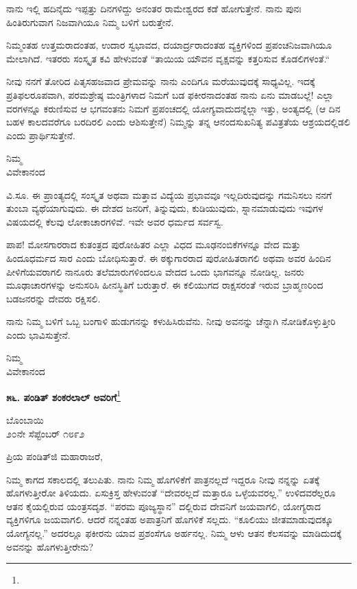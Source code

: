 ನಾನು ಇಲ್ಲಿ ಹದಿನೈದು ಇಪ್ಪತ್ತು ದಿನಗಳಿದ್ದು ಅನಂತರ ರಾಮೇಶ್ವರದ ಕಡೆ ಹೋಗುತ್ತೇನೆ. ನಾನು ಪುನಃ ಹಿಂತಿರುಗುವಾಗ ನಿಜವಾಗಿಯೂ ನಿಮ್ಮ ಬಳಿಗೆ ಬರುತ್ತೇನೆ.

ನಿಮ್ಮಂತಹ ಉತ್ತಮರಾದಂತಹ, ಉದಾರ ಸ್ವಭಾವದ, ದಯಾರ್ದ್ರರಾದಂತಹ ವ್ಯಕ್ತಿಗಳಿಂದ ಪ್ರಪಂಚನಿಜವಾಗಿಯೂ ಮೇಲಾಗಿದೆ. ಇತರರು ಸಂಸ್ಕೃತ ಕವಿ ಹೇಳುವಂತೆ “ತಾಯಿಯ ಯೌವನ ವೃಕ್ಷವನ್ನು ಕತ್ತರಿಸುವ ಕೊಡಲಿಗಳಂತೆ.“

ನೀವು ನನಗೆ ತೋರಿದ ಪಿತೃಸಹಜವಾದ ಪ್ರೇಮವನ್ನು ನಾನು ಎಂದಿಗೂ ಮರೆಯುವುದಕ್ಕೆ ಸಾಧ್ಯವಿಲ್ಲ. ಇದಕ್ಕೆ ಪ್ರತಿಫಲರೂಪವಾಗಿ, ಪರಮಶ್ರೇಷ್ಠ ಮಂತ್ರಿಗಳಾದ ನಿಮಗೆ ಬಡ ಫಕೀರನಾದಂತಹ ನಾನು ಏನು ಮಾಡಬಲ್ಲೆ! ಎಲ್ಲಾ ವರಗಳನ್ನೂ ಕರುಣಿಸುವ ಆ ಭಗವಂತನು ನಿಮಗೆ ಪ್ರಪಂಚದಲ್ಲಿ ಯೋಗ್ಯವಾದುದನ್ನೆಲ್ಲಾ ಇತ್ತು, ಅಂತ್ಯದಲ್ಲಿ (ಆ ದಿನ ಬಹಳ ಕಾಲದವರೆಗೂ ಬರದಿರಲಿ ಎಂದು ಆಶಿಸುತ್ತೇನೆ) ನಿಮ್ಮನ್ನು ತನ್ನ ಆನಂದಸುಖನಿತ್ಯ ಪವಿತ್ರತೆಯ ಆಶ್ರಯದಲ್ಲಿಡಲಿ ಎಂದು ಪ್ರಾರ್ಥಿಸುತ್ತೇನೆ.

{\flushright
ನಿಮ್ಮ\\ವಿವೇಕಾನಂದ\par}

\medskip

ವಿ.ಸೂ. \enginline{-}ಈ ಪ್ರಾಂತ್ಯದಲ್ಲಿ ಸಂಸ್ಕೃತ ಅಥವಾ ಮತ್ತಾವ ವಿದ್ಯೆಯ ಪ್ರಭಾವವೂ ಇಲ್ಲದಿರುವುದನ್ನು ಗಮನಿಸಲು ನನಗೆ ತುಂಬಾ ವ್ಯಥೆಯಾಗುವುದು. ಈ ದೇಶದ ಜನರಿಗೆ, ತಿನ್ನುವುದು, ಕುಡಿಯುವುದು, ಸ್ನಾನಮಾಡುವುದು ಇವುಗಳ ವಿಷಯದಲ್ಲಿ ಕೆಲವು ಲೋಕಾಚಾರಗಳಿವೆ. ಇವೇ ಅವರ ಧರ್ಮದ ಸರ್ವಸ್ವ.

ಪಾಪ! ಮೋಸಗಾರರಾದ ಕುತಂತ್ರದ ಪುರೋಹಿತರ ಎಲ್ಲಾ ವಿಧದ ಮೂಢನಂಬಿಕೆಗಳನ್ನೂ ವೇದ ಮತ್ತು ಹಿಂದೂಧರ್ಮದ ಸಾರ ಎಂದು ಬೋಧಿಸುತ್ತಾರೆ. ಈ ಠಕ್ಕುಗಾರರಾದ ಪುರೋಹಿತರಾಗಲಿ ಅಥವಾ ಅವರ ಹಿಂದಿನ ಪೀಳಿಗೆಯವರಾಗಲಿ ನಾನೂರು ತಲೆಮಾರುಗಳಿಂದಲೂ ವೇದದ ಒಂದು ಭಾಗವನ್ನೂ ನೋಡಿಲ್ಲ. ಜನರು ಮೂಢಾಚಾರಗಳನ್ನು ಅನುಸರಿಸಿ ಹೀನಸ್ಥಿತಿಗೆ ಬರುತ್ತಾರೆ. ಈ ಕಲಿಯುಗದ ರಾಕ್ಷಸರಂತೆ ಇರುವ ಬ್ರಾಹ್ಮಣರಿಂದ ಬಡಜನರನ್ನು ದೇವರು ರಕ್ಷಿಸಲಿ.

ನಾನು ನಿಮ್ಮ ಬಳಿಗೆ ಒಬ್ಬ ಬಂಗಾಳಿ ಹುಡುಗನನ್ನು ಕಳುಹಿಸಿರುವೆನು. ನೀವು ಅವನನ್ನು ಚೆನ್ನಾಗಿ ನೋಡಿಕೊಳ್ಳುತ್ತೀರಿ ಎಂದು ಭಾವಿಸುತ್ತೇನೆ.


{\flushright
ನಿಮ್ಮ\\ವಿವೇಕಾನಂದ\par}

\begin{center}
\textbf{೫೬. ಪಂಡಿತ್‌ ಶಂಕರಲಾಲ್ ಅವರಿಗೆ}\footnote{}
\end{center}


\begin{flushright}
ಬೊಂಬಾಯಿ\\೨೦ನೇ ಸೆಪ್ಟೆಂಬರ್ ೧೮೯೨
\end{flushright}

\noindent
ಪ್ರಿಯ ಪಂಡಿತ್‌ಜಿ ಮಹಾರಾಜರೆ,

ನಿಮ್ಮ ಕಾಗದ ಸಕಾಲದಲ್ಲಿ ತಲುಪಿತು. ನಾನು ನಿಮ್ಮ ಹೊಗಳಿಕೆಗೆ ಪಾತ್ರನಲ್ಲದೆ ಇದ್ದರೂ ನೀವು ನನ್ನನ್ನು ಏತಕ್ಕೆ ಹೊಗಳುತ್ತೀರೋ ತಿಳಿಯದು. ಏಸುಕ್ರಿಸ್ತ ಹೇಳುವಂತೆ “ದೇವರಲ್ಲದೆ ಮತ್ತಾರೂ ಒಳ್ಳೆಯವರಲ್ಲ.” ಉಳಿದವರೆಲ್ಲರೂ ಆತನ ಕೈಯಲ್ಲಿರುವ ಯಂತ್ರಸದೃಶ.  “ಪರಮ ಪೂಜ್ಯಸ್ಥಾನ” ದಲ್ಲಿರುವ ದೇವನಿಗೆ ಜಯವಾಗಲಿ, ಯೋಗ್ಯರಾದ ವ್ಯಕ್ತಿಗಳಿಗೂ ಜಯವಾಗಲಿ. ಆದರೆ ನನ್ನಂತಹ ಅಪಾತ್ರನಿಗೆ ಹೊಗಳಿಕೆ ಸಲ್ಲದು. “ಕೂಲಿಯು ಜೀತಮಾಡುವುದಕ್ಕೂ ಯೋಗ್ಯನಲ್ಲ.” ಅದರಲ್ಲೂ ಫಕೀರನು ಯಾವ ಪ್ರಶಂಸೆಗೂ ಅರ್ಹನಲ್ಲ. ನಿಮ್ಮ ಆಳು ಆತನ ಕೆಲಸವನ್ನು ಮಾಡಿದುದಕ್ಕೆ ಅವನನ್ನು ಹೊಗಳುತ್ತೀರೇನು?

